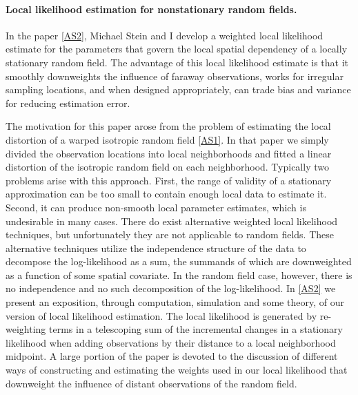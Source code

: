 \documentclass[12pt]{article}
\begin{document}
\paragraph{Local likelihood estimation for nonstationary random fields.}
In the paper \ref{AS2}, Michael Stein and I develop a weighted local likelihood estimate for the parameters that govern the local spatial dependency of a locally stationary random field. The advantage of this local likelihood estimate is that it smoothly downweights the influence of faraway observations, works for irregular sampling locations, and when designed appropriately, can trade bias and variance for reducing estimation error.

The motivation for this paper arose from the problem of estimating the local distortion of a warped isotropic random field \ref{AS1}. In that paper we simply divided the observation locations into local neighborhoods and fitted a linear distortion of the isotropic random field on each neighborhood. Typically two problems arise with this approach. First, the range of validity of a stationary approximation can be too small to contain enough local data to estimate it. Second, it can produce non-smooth local parameter estimates, which is undesirable in many cases. There do exist alternative weighted local likelihood techniques, but unfortunately they are not applicable to random fields. These alternative techniques utilize the independence structure of the data to decompose the log-likelihood as a sum, the summands of which are downweighted as a function of some spatial covariate. In the random field case, however, there is no independence and no such decomposition of the log-likelihood.
In \ref{AS2} we present an exposition, through computation, simulation and some theory, of our version of local likelihood estimation.
The local likelihood is generated by re-weighting  terms in a telescoping sum of the incremental changes in a stationary likelihood when adding observations by their distance to a local neighborhood midpoint.
A large portion of the paper is devoted to the discussion of different ways of constructing and estimating the weights used in our local likelihood that downweight the influence of distant observations of the random field.
\end{document}
